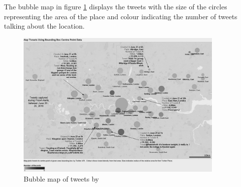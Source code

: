 The bubble map in figure \ref{fig:baker_bubble} displays the tweets with the size of the circles
representing the area of the place and colour indicating the number of tweets talking about the
location.
\begin{figure}[H]
\begin{center}
  \includegraphics[width=0.9\textwidth]{./images/baker_bubble.png}
\end{center}
\caption{Bubble map of tweets by }
\label{fig:baker_bubble}
\end{figure}
